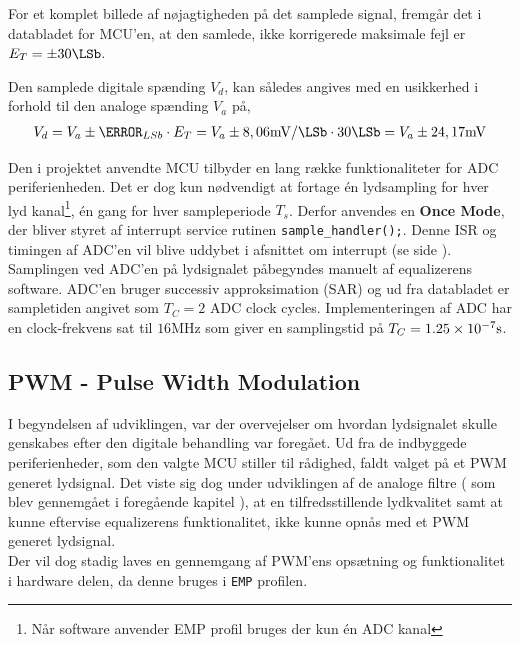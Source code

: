 For et komplet billede af nøjagtigheden på det samplede signal, fremgår det i databladet \cite[afsnit 24.14 s. 1383]{tm4c123gh6pm} for MCU'en, at
den samlede, ikke korrigerede maksimale fejl er $E_T = \pm 30\si{\LSb}$.

Den samplede digitale spænding $V_{d}$, kan således angives med en usikkerhed i forhold til den analoge spænding $V_{a}$ på,
\begin{align}
V_{d} = V_{a} \pm \V_{LSb} \cdot E_T = V_{a} \pm   8,06\si{\milli\volt\per\LSb} \cdot 30 \si{\LSb} = V_{a} \pm 24,17\si{\milli\volt}
\end{align} 

Den i projektet anvendte MCU tilbyder en lang række funktionaliteter for ADC periferienheden.
Det er dog kun nødvendigt at fortage én lydsampling for hver lyd kanal\footnote{Når software anvender EMP profil bruges der kun én ADC kanal}, én gang for hver sampleperiode $T_s$.
Derfor anvendes en \textbf{Once Mode}\cite[afsnit 13.3.7.2, s. 812]{tm4c123gh6pm}, der bliver styret af interrupt service rutinen \texttt{sample\_handler();}. Denne ISR og timingen af ADC'en vil blive uddybet i afsnittet om interrupt (se side \pageref{subsec:interrupt}).\\

Samplingen ved ADC'en på lydsignalet påbegyndes manuelt af equalizerens software.
ADC'en bruger successiv approksimation (SAR) og ud fra databladet er sampletiden angivet som $T_C = 2$ ADC clock cycles. 
Implementeringen af ADC har en clock-frekvens sat til $16 \si{\mega\hertz}$ som giver en samplingstid på $T_C = \num{1,25E-7}\si{\second}$.  

\subsection{PWM - Pulse Width Modulation}\label{subsec:pwm}
I begyndelsen af udviklingen, var der overvejelser om hvordan lydsignalet skulle genskabes efter den digitale behandling var foregået.
Ud fra de indbyggede periferienheder, som den valgte MCU stiller til rådighed, faldt valget på et PWM generet lydsignal.
Det viste sig dog under udviklingen af de analoge filtre ( som blev gennemgået i foregående kapitel ), at en tilfredsstillende lydkvalitet samt at kunne eftervise equalizerens funktionalitet, ikke kunne opnås med et PWM generet lydsignal. \\
Der vil dog stadig laves en gennemgang af PWM'ens opsætning og funktionalitet i hardware delen, da denne bruges i \texttt{EMP} profilen.\\

